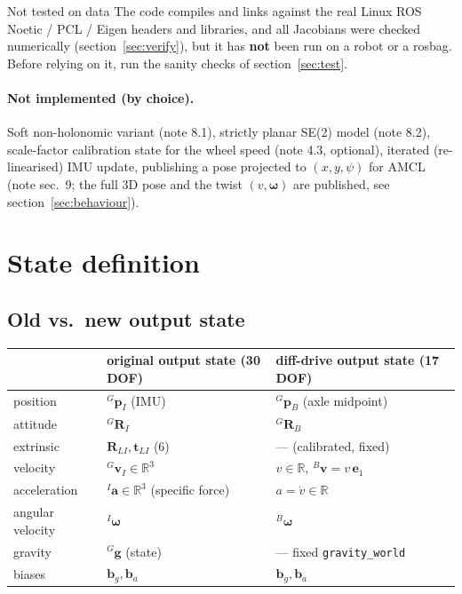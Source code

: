 \documentclass[11pt,a4paper]{article}
\newcommand{\f}[1]{\texttt{#1}}
\newcommand{\R}{\mathbf{R}}
\newcommand{\p}{\mathbf{p}}
\newcommand{\w}{\bm{\omega}}
\newcommand{\e}{\mathbf{e}}
\newcommand{\g}{\mathbf{g}}
\begin{document}
\begin{warn}{Not tested on data}
The code compiles and links against the real Linux ROS Noetic / PCL / Eigen
headers and libraries, and all Jacobians were checked numerically
(section~\ref{sec:verify}), but it has \textbf{not} been run on a robot or a
rosbag. Before relying on it, run the sanity checks of section~\ref{sec:test}.
\end{warn}

\paragraph{Not implemented (by choice).} Soft non-holonomic variant (note 8.1),
strictly planar SE(2) model (note 8.2), scale-factor calibration state for the
wheel speed (note 4.3, optional), iterated (re-linearised) IMU update, publishing
a pose projected to $(x,y,\psi)$ for AMCL (note sec.\ 9; the full 3D pose and
the twist $(v,\w)$ are published, see section~\ref{sec:behaviour}).

\section{State definition}

\subsection{Old vs.\ new output state}

\begin{center}
\begin{tabular}{@{}lll@{}}
\toprule
& original output state (30 DOF) & diff-drive output state (17 DOF)\\
\midrule
position & $^G\p_I$ (IMU) & $^G\p_B$ (axle midpoint)\\
attitude & $^G\R_I$ & $^G\R_B$\\
extrinsic & $\R_{LI}, \mathbf t_{LI}$ (6) & --- (calibrated, fixed)\\
velocity & $^G\mathbf v_I\in\mathbb R^3$ & $v\in\mathbb R$, $^B\mathbf v=v\,\e_1$\\
acceleration & $^I\mathbf a\in\mathbb R^3$ (specific force) & $a=\dot v\in\mathbb R$\\
angular velocity & $^I\w$ & $^B\w$\\
gravity & $^G\g$ (state) & --- fixed \f{gravity\_world}\\
biases & $\mathbf b_g,\mathbf b_a$ & $\mathbf b_g,\mathbf b_a$\\
\bottomrule
\end{tabular}
\end{center}
\end{document}
